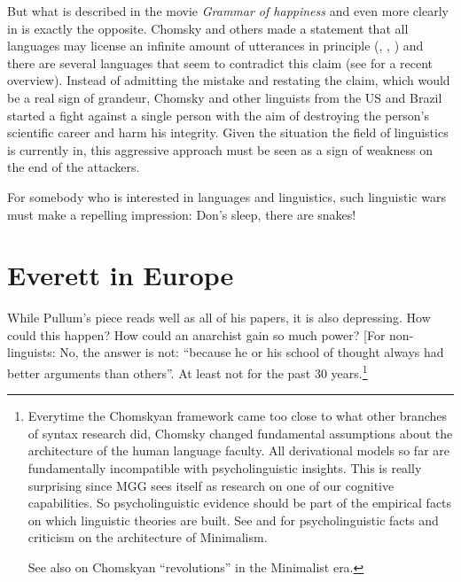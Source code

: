 \documentclass[output=paper,colorlinks,citecolor=brown]{langscibook}
\begin{document}
But what is described in the movie \emph{Grammar of happiness}  and even more clearly
in  is exactly the opposite. Chomsky and others made a statement that all languages may license an infinite amount of utterances in principle (\citealt*[]{HCF2002a}, \citealt[]{EH2005a-u}, \citealt*[]{HNG2005a}) and there are several languages that seem to contradict this claim (see
 for a recent overview). Instead of
admitting the mistake and restating the claim, which would be a real sign of grandeur, Chomsky and
other linguists from the US and Brazil started a fight against a single person with the aim of destroying the
person's scientific career and harm his integrity. Given the situation the field of linguistics is currently in,
this aggressive approach must be seen as a sign of weakness on the end of the attackers.

For somebody who is interested in languages and linguistics, such linguistic wars \citep{Harris93a} must make a
repelling impression: Don's sleep, there are snakes!    

\section{Everett in Europe}

While Pullum's piece reads well as all of his papers, it is also depressing. How could this happen?
How could an anarchist gain so much power? [For non-linguists: No, the answer is not: ``because he or
his school of thought always had better arguments than others''. At least not for the past 30
years.\footnote{
Everytime the Chomskyan framework came too close to what other branches of syntax research did,
Chomsky changed fundamental assumptions about the architecture of the human language faculty. All
derivational models so far are fundamentally incompatible with psycholinguistic insights. This is really
surprising since MGG sees itself as research on one of our cognitive capabilities. So
psycholinguistic evidence should be part of the empirical facts on which linguistic theories are
built. See  and \citet{BM2021a} for psycholinguistic facts and criticism on the
architecture of Minimalism.

See also  on Chomskyan ``revolutions'' in the Minimalist era.
}
\end{document}
